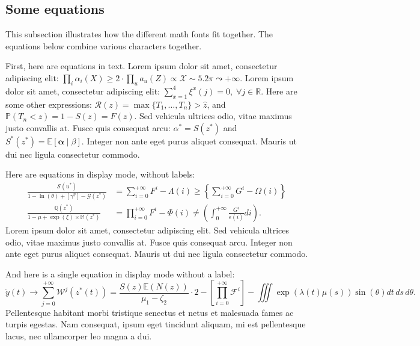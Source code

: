 \documentclass[letterpaper,11pt,leqno]{article}
\begin{document}
\subsection{Some equations} 

This subsection illustrates how the different math fonts fit together. The equations below combine various characters together.

First, here are equations in text. Lorem ipsum dolor sit amet, consectetur adipiscing elit: $\prod_i\alpha_i(X) \geq 2 \cdot\prod_u a_u(Z) \propto \mathcal{X} \sim 5.2\pi \leadsto +\infty$. Lorem ipsum dolor sit amet, consectetur adipiscing elit: $\sum_{x=1}^4 \xi^x(j)=0, \; \forall j\in \mathbb{R}$. Here are some other expressions: $\mathcal{R}(z) = \max\{T_1,\ldots,T_{n}\} > \hat{z}$, and  $\mathbb{P}(T_n < z) = 1 - S(z) = F(z)$.  Sed vehicula ultrices odio, vitae maximus justo convallis at. Fusce quis consequat arcu: $\alpha^* = S(z^*)$ and $S^*(z^*)=\mathbb{E}[\bm{\alpha}\mid \beta]$. Integer non ante eget purus aliquet consequat. Mauris ut dui nec ligula consectetur commodo.

Here are equations in display mode, without labels:
\begin{align*}
\frac{\mathcal{S}(u^*)}{1 -\ln(\theta) + \left[\gamma^\eta\right] - \mathcal{G}(z^*)} &= \sum_{i=0}^{+\infty}F^{i} - \Lambda(i) \geq \left\lbrace\sum_{i=0}^{+\infty}G^{i} - \Omega(i)\right\rbrace\\
\frac{\mathbb{Q}(z^*)}{1 -\mu + \exp(\xi) \times \mathbb{M}(z^*)} &= \prod_{i=0}^{+\infty}F^{i} - \Phi(i) \neq \left(\int_{0}^{+\infty}\frac{G^{i}}{\epsilon(i)} di\right).
\end{align*}
Lorem ipsum dolor sit amet, consectetur adipiscing elit. Sed vehicula ultrices odio, vitae maximus justo convallis at. Fusce quis consequat arcu. Integer non ante eget purus aliquet consequat. Mauris ut dui nec ligula consectetur commodo.

And here is a single equation in display mode without a label:
\begin{equation*}
\dot{y}(t) \to \sum_{j=0}^{+\infty}\mathcal{W}^j(z^{\ast}(t)) = \frac{S(z) \mathbb{E}(N(z))}{\mu_1 - \zeta_2} \cdot 2 - \left[\prod_{i=0}^{+\infty}\mathcal{F}^{i}\right]-\iiint\exp(\lambda(t) \mu(s)) \sin(\theta)dt\,ds\,d\theta.
\end{equation*}
Pellentesque habitant morbi tristique senectus et netus et malesuada fames ac turpis egestas. Nam consequat, ipsum eget tincidunt aliquam, mi est pellentesque lacus, nec ullamcorper leo magna a dui.
\end{document}
